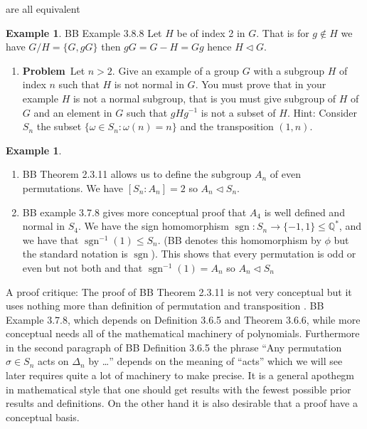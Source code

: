 \documentclass[12pt]{amsart}
\newcommand{\benu}{\begin{enumerate}}
\newcommand{\eenu}{\end{enumerate}}
\theoremstyle{definition}
\newtheorem{example}[theorem]{Example}
\newcommand{\bax}{\begin{example}}
\newcommand{\ax}{\end{example}}
\newcommand{\mbQ}{\mathbb{Q}}
\DeclareMathOperator{\sgn}{sgn}
\newcommand{\itep}{\item {\bfseries Problem}\ }
\begin{document}
are all equivalent
\bax BB Example 3.8.8 Let $H$ be of index 2 in $G$. That is for $g\notin H$ we have $G/H=\{G,gG\}$ then $gG=G-H=Gg$ hence $H\lhd G$. 
\ax
\begin{enumerate}[resume=p]
\itep Let $n>2$. Give an example of a group $G$ with a subgroup $H$ of index $n$ such that $H$ is not normal in $G$. You must prove that in your example $H$ is not a  normal subgroup, that is you must give subgroup of $H$ of $G$ and an element in $G$ such that $gHg^{-1}$ is not a subset of $H$. Hint: Consider $S_n$ the subset $\{\omega\in S_n:\omega(n)=n\}$ and the transposition $(1,n)$.

\end{enumerate}


\bax \hfill
\benu
\item BB Theorem 2.3.11  allows us to define the subgroup $A_n$ of even permutations. We have $[S_n:A_n]=2$ so $A_n\lhd  S_n$. 

\item BB example 3.7.8 gives more conceptual proof that $A_4$ is well defined and normal in $S_4$. We  have the sign homomorphism $\sgn\colon S_n\to \{-1,1\}\leq \mbQ^*$, and we have that $\sgn^{-1}(1)\leq S_n$. (BB denotes this homomorphism by $\phi$ but the standard notation is $\sgn$). This shows that every permutation is odd or even but not both and that $\sgn^{-1}(1)=A_n$ so $A_n\lhd S_n$
\eenu
\ax
 A proof critique: The proof of BB Theorem 2.3.11 is not very conceptual but it uses nothing more than definition of permutation and transposition . BB Example 3.7.8,  which depends on Definition 3.6.5 and Theorem 3.6.6, while more conceptual needs  all of the mathematical machinery of polynomials. Furthermore in the second paragraph of BB Definition 3.6.5 the phrase ``Any permutation $\sigma\in S_n$ acts on $\Delta_n$ by \ldots'' depends on the meaning of ``acts'' which we will see later requires quite a lot of machinery to make precise. It is a general apothegm in mathematical style that one should get results with the fewest possible prior results and definitions. On the other hand it is also desirable that a proof have a conceptual basis.
\end{document}
